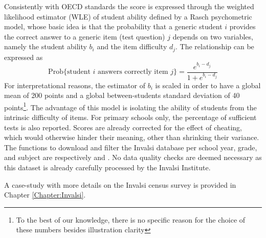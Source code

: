 \documentclass[openany, 11pt, oneside]{book}
\begin{document}
Consistently with OECD standards \parencite{PISA} the score is expressed through the weighted likelihood estimator (WLE) of student ability defined by a Rasch psychometric model, whose basic idea is that the probability that a generic student $i$ provides the correct answer to a generic item (test question) $j$ depends on two variables, namely the student ability $b_i$ and the item difficulty $d_j$. The relationship can be expressed as
$$
\mathrm{Prob} \lbrace \text{student } i \text{ answers correctly item } j \rbrace= \frac{e^{b_i - d_j}}{1 + e^{b_i - d_j}}
$$
For interpretational reasons, the estimator of $b_i$ is scaled in order to have a global mean of 200 points and a global between-students standard deviation of 40 points\footnote{To the best of our knowledge, there is no specific reason for the choice of these numbers besides illustration clarity}. The advantage of this model is isolating the ability of students from the intrinsic difficulty of items. For primary schools only, the percentage of sufficient tests is also reported. Scores are already corrected for the effect of cheating, which would otherwise hinder their meaning, other than shrinking their variance. The functions to download and filter the Invalsi database per school year, grade, and subject are respectively \texttt{} and \texttt{}. No data quality checks are deemed necessary as this dataset is already carefully processed by the Invalsi Institute.

A case-study with more details on the Invalsi census survey is provided in Chapter \ref{Chapter:Invalsi}.


\end{document}
